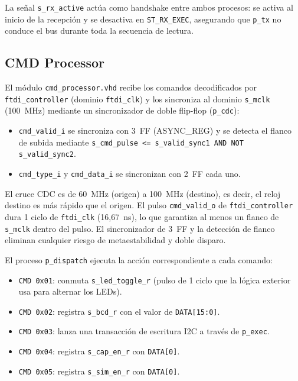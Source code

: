 \documentclass[../main.tex]{subfiles}
\begin{document}
La señal \texttt{s\_rx\_active} actúa como handshake entre ambos procesos: se activa al inicio de la recepción y se desactiva en \texttt{ST\_RX\_EXEC}, asegurando que \texttt{p\_tx} no conduce el bus durante toda la secuencia de lectura.

\subsection{CMD Processor}
\label{sec:cmd_processor}

El módulo \texttt{cmd\_processor.vhd} recibe los comandos decodificados por \texttt{ftdi\_controller} (dominio \texttt{ftdi\_clk}) y los sincroniza al dominio \texttt{s\_mclk} (100~MHz) mediante un sincronizador de doble flip-flop (\texttt{p\_cdc}):

\begin{itemize}
    \item \texttt{cmd\_valid\_i} se sincroniza con 3~FF (ASYNC\_REG) y se detecta el flanco de subida mediante \texttt{s\_cmd\_pulse <= s\_valid\_sync1 AND NOT s\_valid\_sync2}.
    \item \texttt{cmd\_type\_i} y \texttt{cmd\_data\_i} se sincronizan con 2~FF cada uno.
\end{itemize}

El cruce CDC es de 60~MHz (origen) a 100~MHz (destino), es decir, el reloj destino es más rápido que el origen. El pulso \texttt{cmd\_valid\_o} de \texttt{ftdi\_controller} dura 1 ciclo de \texttt{ftdi\_clk} (16{,}67~ns), lo que garantiza al menos un flanco de \texttt{s\_mclk} dentro del pulso. El sincronizador de 3~FF y la detección de flanco eliminan cualquier riesgo de metaestabilidad y doble disparo.

El proceso \texttt{p\_dispatch} ejecuta la acción correspondiente a cada comando:

\begin{itemize}
    \item \texttt{CMD 0x01}: conmuta \texttt{s\_led\_toggle\_r} (pulso de 1 ciclo que la lógica exterior usa para alternar los LEDs).
    \item \texttt{CMD 0x02}: registra \texttt{s\_bcd\_r} con el valor de \texttt{DATA[15:0]}.
    \item \texttt{CMD 0x03}: lanza una transacción de escritura I2C a través de \texttt{p\_exec}.
    \item \texttt{CMD 0x04}: registra \texttt{s\_cap\_en\_r} con \texttt{DATA[0]}.
    \item \texttt{CMD 0x05}: registra \texttt{s\_sim\_en\_r} con \texttt{DATA[0]}.
\end{itemize}
\end{document}
